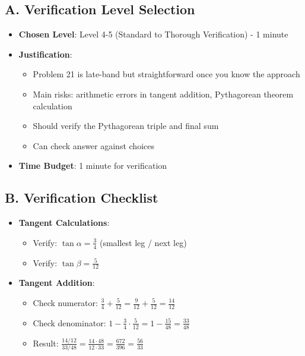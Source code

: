 \documentclass[12pt]{article}
\begin{document}
\begin{verificationbox}
\subsection*{A. Verification Level Selection}
\begin{itemize}[leftmargin=*]
    \item \textbf{Chosen Level}: Level 4-5 (Standard to Thorough Verification) - 1 minute
    
    \item \textbf{Justification}: 
    \begin{itemize}
        \item Problem 21 is late-band but straightforward once you know the approach
        \item Main risks: arithmetic errors in tangent addition, Pythagorean theorem calculation
        \item Should verify the Pythagorean triple and final sum
        \item Can check answer against choices
    \end{itemize}
    
    \item \textbf{Time Budget}: 1 minute for verification
\end{itemize}

\subsection*{B. Verification Checklist}
\begin{itemize}[leftmargin=*]
    \item \textbf{Tangent Calculations}:
    \begin{itemize}
        \item Verify: $\tan\alpha = \frac{3}{4}$ (smallest leg / next leg) \checkmark
        \item Verify: $\tan\beta = \frac{5}{12}$ \checkmark
    \end{itemize}
    
    \item \textbf{Tangent Addition}:
    \begin{itemize}
        \item Check numerator: $\frac{3}{4} + \frac{5}{12} = \frac{9}{12} + \frac{5}{12} = \frac{14}{12}$ \checkmark
        \item Check denominator: $1 - \frac{3}{4} \cdot \frac{5}{12} = 1 - \frac{15}{48} = \frac{33}{48}$ \checkmark
        \item Result: $\frac{14/12}{33/48} = \frac{14 \cdot 48}{12 \cdot 33} = \frac{672}{396} = \frac{56}{33}$ \checkmark
    \end{itemize}
    

\end{itemize}
\end{verificationbox}
\end{document}
